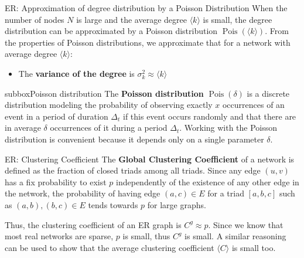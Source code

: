 \begin{textbox}{ER: Approximation of degree distribution by a Poisson Distribution}
    When the number of nodes $N$ is large and the average degree $\langle k \rangle$ is small, the degree distribution can be approximated by a Poisson distribution $\operatorname {Pois}(\langle k \rangle)$. From the properties of Poisson distributions, we approximate that for a network with average degree $\langle k \rangle$:
    \begin{itemize}
        \item The \textbf{variance of the degree} is $\sigma_k^2 \approx{\langle k \rangle}$
    \end{itemize}
\end{textbox}


\begin{subbox}{subbox}{Poisson distribution}
    The \textbf{Poisson distribution} $\operatorname {Pois}(\delta)$ is a discrete distribution modeling the probability of observing exactly $x$ occurrences of an event in a period of duration $\Delta_t$ if this event occurs randomly and that there are in average $\delta$ occurrences of it during a period $\Delta_t$. Working with the Poisson distribution is convenient because it depends only on a single parameter $\delta$. %
\end{subbox}

\begin{textbox}{ER: Clustering Coefficient}
    The \textbf{Global Clustering Coefficient} of a network is defined as the fraction of closed triads among all triads. Since any edge $(u,v)$ has a fix probability to exist $p$ independently of the existence of any other edge in the network, the probability of having edge $(a,c) \in E$ for a triad $[a,b,c]$ such as $(a,b),(b,c) \in E$ tends towards $p$ for large graphs.

    Thus, the clustering coefficient of an ER graph is $C^g\approx p$. Since we know that most real networks are sparse, $p$ is small, thus $C^g$ is small. A similar reasoning can be used to show that the average clustering coefficient $\langle C \rangle$ is small too.
\end{textbox}



